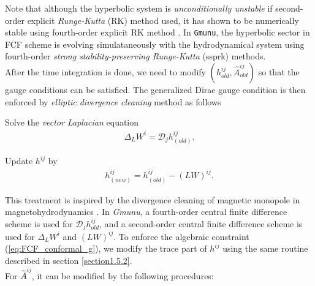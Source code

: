 Note that although the hyperbolic system is \textit{unconditionally unstable} if second-order explicit \textit{Runge-Kutta} (RK) method used,
it has shown to be numerically stable using fourth-order explicit RK method \cite{cordero2012partially,shibata2015numerical}.
In \texttt{Gmunu}, the hyperbolic sector in FCF scheme is evolving simulataneously with the hydrodynamical system using 
fourth-order \textit{strong stability-preserving Runge-Kutta} (ssprk) methods.\\
After the time integration is done,
we need to modify $\left(h^{ij}_{old}, \hat{A}^{ij}_{old}\right)$ so that the gauge conditions can be satisfied.
The generalized Dirac gauge condition is then enforced by \textit{elliptic divergence cleaning} method as follows
\begin{Step}
    \item Solve the \textit{vector Laplacian} equation
    \begin{align}
        \Delta_L W^i = \mathcal{D}_j h^{ij}_{(old)}.
    \end{align}
    \item Update $h^{ij}$ by
    \begin{align}
        h^{ij}_{(new)} = h^{ij}_{(old)} - \left( L W \right)^{ij}.
    \end{align}
\end{Step}
This treatment is inspired by the divergence cleaning of magnetic monopole in magnetohydrodynamics \cite{balsara2004comparison,teunissen2019geometric,balsara1998total}.
In \textit{Gmunu}, a fourth-order central finite difference scheme is used for $\mathcal{D}_j h^{ij}_{old}$,
and a second-order central finite difference scheme is used for $\Delta_L W^i$ and $\left( L W \right)^{ij}$.
To enforce the algebraic constraint (\ref{eq:FCF_conformal_g}),
we modify the trace part of $h^{ij}$ using the same routine described in section \ref{section1.5.2}.\\
For $\hat{A}^{ij}$, it can be modified by the following procedures:
